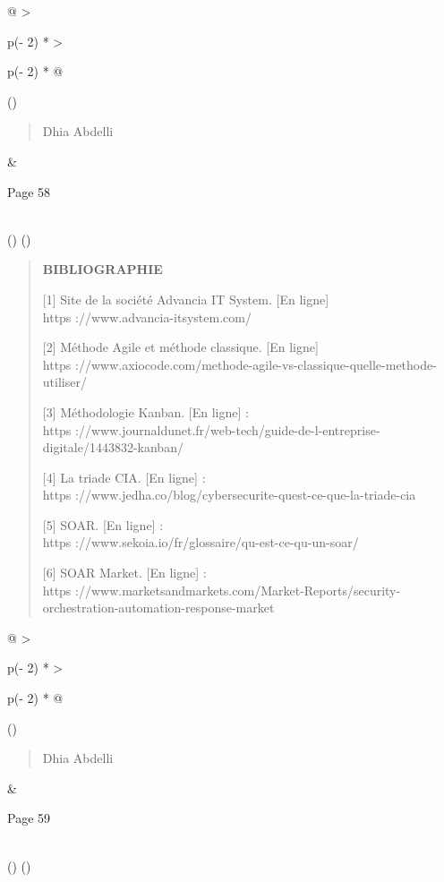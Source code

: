 \documentclass[
]{article}
\begin{document}
\begin{longtable}[]{@{}
  >{\raggedright\arraybackslash}p{(\columnwidth - 2\tabcolsep) * }
  >{\raggedright\arraybackslash}p{(\columnwidth - 2\tabcolsep) * }@{}}
\toprule()
\begin{minipage}[b]{\linewidth}\raggedright
\begin{quote}
Dhia Abdelli
\end{quote}
\end{minipage} & \begin{minipage}[b]{\linewidth}\raggedright
Page 58
\end{minipage} \\
\midrule()
\endhead
\bottomrule()
\end{longtable}

\begin{quote}
\textbf{BIBLIOGRAPHIE}

{[}1{]} Site de la société Advancia IT System. {[}En ligne{]}\\
https ://www.advancia-itsystem.com/

{[}2{]} Méthode Agile et méthode classique. {[}En ligne{]}\\
https
://www.axiocode.com/methode-agile-vs-classique-quelle-methode-utiliser/

{[}3{]} Méthodologie Kanban. {[}En ligne{]} :\\
https
://www.journaldunet.fr/web-tech/guide-de-l-entreprise-digitale/1443832-kanban/

{[}4{]} La triade CIA. {[}En ligne{]} :\\
https ://www.jedha.co/blog/cybersecurite-quest-ce-que-la-triade-cia

{[}5{]} SOAR. {[}En ligne{]} :\\
https ://www.sekoia.io/fr/glossaire/qu-est-ce-qu-un-soar/

{[}6{]} SOAR Market. {[}En ligne{]} :\\
https
://www.marketsandmarkets.com/Market-Reports/security-orchestration-automation-response-market
\end{quote}

\begin{longtable}[]{@{}
  >{\raggedright\arraybackslash}p{(\columnwidth - 2\tabcolsep) * }
  >{\raggedright\arraybackslash}p{(\columnwidth - 2\tabcolsep) * }@{}}
\toprule()
\begin{minipage}[b]{\linewidth}\raggedright
\begin{quote}
Dhia Abdelli
\end{quote}
\end{minipage} & \begin{minipage}[b]{\linewidth}\raggedright
Page 59
\end{minipage} \\
\midrule()
\endhead
\bottomrule()
\end{longtable}
\end{document}
